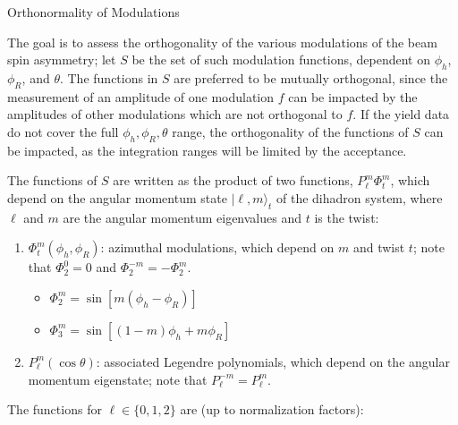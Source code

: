 \documentclass[12pt]{article}
\begin{document}
\begin{center}
{\LARGE 
Orthonormality of Modulations
}
\end{center}


The goal is to assess the orthogonality of the various modulations of the beam
spin asymmetry; let $S$ be the set of such modulation functions, dependent on
$\phi_h$, $\phi_R$, and $\theta$. The functions in $S$ are preferred to be
mutually orthogonal, since the measurement of an amplitude of one modulation $f$
can be impacted by the amplitudes of other modulations which are not orthogonal
to $f$.  If the yield data do not cover the full $\phi_h,\phi_R,\theta$ range,
the orthogonality of the functions of $S$ can be impacted, as the integration
ranges will be limited by the acceptance. 

The functions of $S$ are written as the product of two functions, 
$P_{\ell}^m\Phi_t^m$, which depend
on the angular momentum state $|\ell,m\rangle_t$ of the dihadron system, where
$\ell$ and $m$ are the angular momentum eigenvalues and $t$ is the twist:
\begin{enumerate}
\item $\Phi_t^m\left(\phi_h,\phi_R\right)$: 
azimuthal modulations, which depend on $m$ and twist $t$; note that $\Phi_2^0=0$ and
$\Phi_2^{-m}=-\Phi_2^{m}$.
  \begin{itemize}
  \item $\Phi_2^m=\sin\left[m\left(\phi_h-\phi_R\right)\right]$
  \item $\Phi_3^m=\sin\left[\left(1-m\right)\phi_h+m\phi_R\right]$
  \end{itemize}
\item $P_{\ell}^{m}\left(\cos\theta\right)$:
associated Legendre polynomials, which depend on the angular momentum
eigenstate; note that $P_{\ell}^{-m}=P_{\ell}^{m}$.
\end{enumerate}
The functions for $\ell\in\{0,1,2\}$ are (up to normalization factors):
\end{document}
